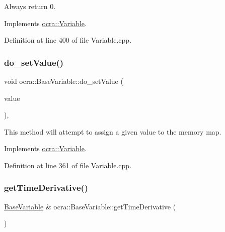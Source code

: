 Always return 0. 



Implements \hyperlink{classocra_1_1Variable_a65de5b31613b74d83baab58f0eb43b35}{ocra\+::\+Variable}.



Definition at line 400 of file Variable.\+cpp.

\hypertarget{classocra_1_1BaseVariable_a4f53b244e0efba4ca19f558113d29a9c}{}\label{classocra_1_1BaseVariable_a4f53b244e0efba4ca19f558113d29a9c} 
\subsubsection{\texorpdfstring{do\+\_\+set\+Value()}{do\_setValue()}}
{\footnotesize\ttfamily void ocra\+::\+Base\+Variable\+::do\+\_\+set\+Value (\begin{DoxyParamCaption}\item[{const Vector\+Xd \&}]{value }\end{DoxyParamCaption})\hspace{0.3cm}{\ttfamily [protected]}, {\ttfamily [virtual]}}



This method will attempt to assign a given value to the memory map. 



Implements \hyperlink{classocra_1_1Variable_a73ff767d0a620f1803573b33f93c69f8}{ocra\+::\+Variable}.



Definition at line 361 of file Variable.\+cpp.

\hypertarget{classocra_1_1BaseVariable_a79a86d7415d8b460ad9f526f685961dc}{}\label{classocra_1_1BaseVariable_a79a86d7415d8b460ad9f526f685961dc} 
\subsubsection{\texorpdfstring{get\+Time\+Derivative()}{getTimeDerivative()}}
{\footnotesize\ttfamily \hyperlink{classocra_1_1BaseVariable}{Base\+Variable} \& ocra\+::\+Base\+Variable\+::get\+Time\+Derivative (\begin{DoxyParamCaption}{ }\end{DoxyParamCaption})\hspace{0.3cm}{\ttfamily [virtual]}}




